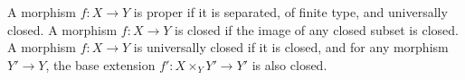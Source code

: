 A morphism $f: X \to Y$ is proper if it is separated, of finite type, and universally closed. A morphism $f: X \to Y$ is closed if the image of any closed subset is closed. A morphism $f: X \to Y$ is universally closed if it is closed, and for any morphism $Y' \to Y$, the base extension $f': X \times_Y Y' \to Y'$ is also closed.
